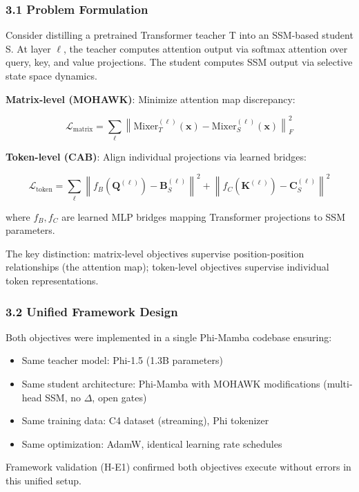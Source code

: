 
\subsubsection{3.1 Problem Formulation}

Consider distilling a pretrained Transformer teacher T into an SSM-based student S. At layer $\ell$, the teacher computes attention output via softmax attention over query, key, and value projections. The student computes SSM output via selective state space dynamics.

\textbf{Matrix-level (MOHAWK)}: Minimize attention map discrepancy:

$$\mathcal{L}_{\text{matrix}} = \sum_{\ell} \left\| \text{Mixer}_T^{(\ell)}(\mathbf{x}) - \text{Mixer}_S^{(\ell)}(\mathbf{x}) \right\|_F^2$$

\textbf{Token-level (CAB)}: Align individual projections via learned bridges:

$$\mathcal{L}_{\text{token}} = \sum_{\ell} \left\| f_B(\mathbf{Q}^{(\ell)}) - \mathbf{B}_S^{(\ell)} \right\|^2 + \left\| f_C(\mathbf{K}^{(\ell)}) - \mathbf{C}_S^{(\ell)} \right\|^2$$

where $f_B, f_C$ are learned MLP bridges mapping Transformer projections to SSM parameters.

The key distinction: matrix-level objectives supervise position-position relationships (the attention map); token-level objectives supervise individual token representations.

\subsubsection{3.2 Unified Framework Design}

Both objectives were implemented in a single Phi-Mamba codebase ensuring:

\begin{itemize}
\item Same teacher model: Phi-1.5 (1.3B parameters)
\item Same student architecture: Phi-Mamba with MOHAWK modifications (multi-head SSM, no $\Delta$, open gates)
\item Same training data: C4 dataset (streaming), Phi tokenizer
\item Same optimization: AdamW, identical learning rate schedules
\end{itemize}

Framework validation (H-E1) confirmed both objectives execute without errors in this unified setup.

